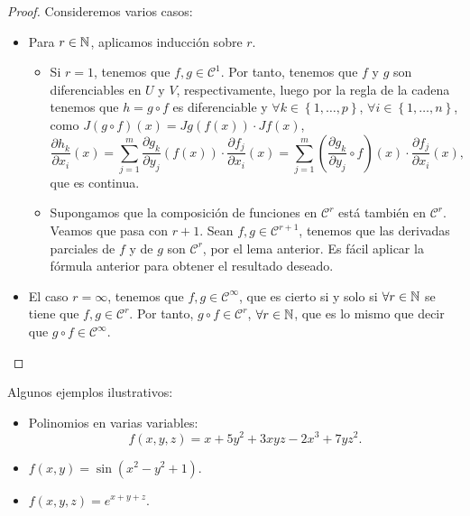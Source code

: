 \begin{proof}
Consideremos varios casos:
\begin{itemize}
\item Para $\displaystyle r \in \mathbb{N} $, aplicamos inducción sobre $\displaystyle r $. 
	\begin{itemize}
		\item Si $\displaystyle r = 1 $, tenemos que $\displaystyle f,g \in \mathcal{C}^{1} $. Por tanto, tenemos que $\displaystyle f $ y $\displaystyle g $ son diferenciables en $\displaystyle U $ y $\displaystyle V $, respectivamente, luego por la regla de la cadena tenemos que $\displaystyle h = g\circ f $ es diferenciable y $\displaystyle \forall k \in\left\{ 1, \ldots, p\right\}  $, $\displaystyle \forall i \in \left\{ 1, \ldots, n\right\}  $, como $\displaystyle J\left(g\circ f\right)\left(x\right) = Jg\left(f\left(x\right)\right) \cdot Jf\left(x\right) $,
			\[\frac{\partial h_{k}}{\partial x_{i}}\left(x\right) = \sum^{m}_{j = 1}\frac{\partial g_{k}}{\partial y_{j}}\left(f\left(x\right)\right) \cdot \frac{\partial f_{j}}{\partial x_{i}}\left(x\right) = \sum^{m}_{j = 1}\left(\frac{\partial g_{k}}{\partial y_{j}}\circ f\right)\left(x\right) \cdot \frac{\partial f_{j}}{\partial x_{i}}\left(x\right) ,\]
			que es continua.
		\item Supongamos que la composición de funciones en $\displaystyle \mathcal{C}^{r} $ está también en $\displaystyle \mathcal{C}^{r} $. Veamos que pasa con $\displaystyle r + 1 $. Sean $\displaystyle f,g \in \mathcal{C}^{r+1} $, tenemos que las derivadas parciales de $\displaystyle f $ y de $\displaystyle g $ son $\displaystyle \mathcal{C}^{r} $, por el lema anterior. Es fácil aplicar la fórmula anterior para obtener el resultado deseado.			
	\end{itemize}
\item El caso $\displaystyle r = \infty $, tenemos que $\displaystyle f, g \in \mathcal{C}^{\infty} $, que es cierto si y solo si $\displaystyle \forall r \in \mathbb{N} $ se tiene que $\displaystyle f,g \in \mathcal{C}^{r} $. Por tanto, $\displaystyle g\circ f \in \mathcal{C}^{r} $, $\displaystyle \forall r \in \mathbb{N} $, que es lo mismo que decir que $\displaystyle g\circ f \in \mathcal{C}^{\infty} $. 
\end{itemize}
\end{proof}
\begin{eg} Algunos ejemplos ilustrativos:
	\begin{itemize}
	\item Polinomios en varias variables:
		\[f\left(x,y,z\right)= x + 5y^{2} + 3xyz -2x^{3}+7yz^{2} .\]
	\item $\displaystyle f\left(x,y\right) = \sin\left(x^{2}-y^{2}+1\right) $.
	\item $\displaystyle f\left(x,y,z\right)=e^{x+y+z} $.
	\end{itemize}
\end{eg}
